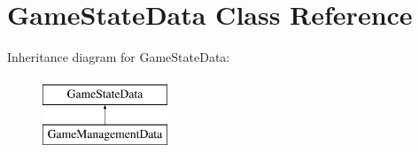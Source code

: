 \hypertarget{class_game_state_data}{\section{Game\+State\+Data Class Reference}
\label{class_game_state_data}
}
Inheritance diagram for Game\+State\+Data\+:\begin{figure}[H]
\begin{center}
\leavevmode
\includegraphics[height=2.000000cm]{class_game_state_data}
\end{center}
\end{figure}
